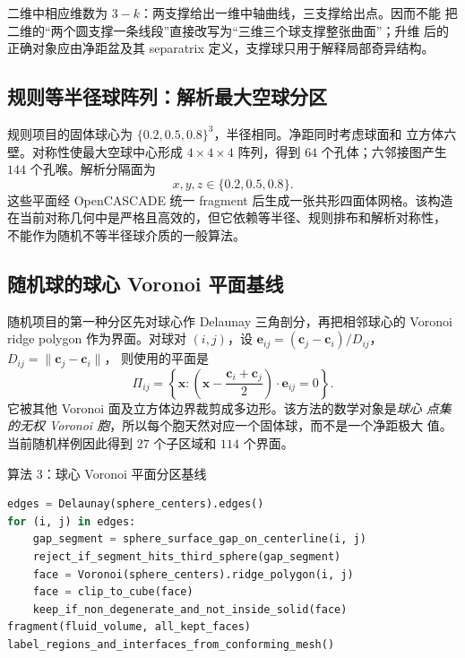 \documentclass[UTF8,zihao=-4]{ctexart}
\begin{document}
二维中相应维数为 $3-k$：两支撑给出一维中轴曲线，三支撑给出点。因而不能
把二维的``两个圆支撑一条线段''直接改写为``三维三个球支撑整张曲面''；升维
后的正确对象应由净距盆及其 separatrix 定义，支撑球只用于解释局部奇异结构。

\subsection{规则等半径球阵列：解析最大空球分区}

规则项目的固体球心为 $\{0.2,0.5,0.8\}^3$，半径相同。净距同时考虑球面和
立方体六壁。对称性使最大空球中心形成 $4\times4\times4$ 阵列，得到
$64$ 个孔体；六邻接图产生 $144$ 个孔喉。解析分隔面为
\begin{equation}
  x,y,z\in\{0.2,0.5,0.8\}.
\end{equation}
这些平面经 OpenCASCADE 统一 fragment 后生成一张共形四面体网格。该构造
在当前对称几何中是严格且高效的，但它依赖等半径、规则排布和解析对称性，
不能作为随机不等半径球介质的一般算法。

\subsection{随机球的球心 Voronoi 平面基线}

随机项目的第一种分区先对球心作 Delaunay 三角剖分，再把相邻球心的 Voronoi
ridge polygon 作为界面。对球对 $(i,j)$，设
$\bm e_{ij}=(\bm c_j-\bm c_i)/D_{ij}$，$D_{ij}=\|\bm c_j-\bm c_i\|$，
则使用的平面是
\begin{equation}\label{eq:vor-plane}
  \Pi_{ij}=\left\{\bm x:
  \left(\bm x-\frac{\bm c_i+\bm c_j}{2}\right)
  \cdot\bm e_{ij}=0\right\}.
\end{equation}
它被其他 Voronoi 面及立方体边界裁剪成多边形。该方法的数学对象是\emph{球心
点集的无权 Voronoi 胞}，所以每个胞天然对应一个固体球，而不是一个净距极大
值。当前随机样例因此得到 $27$ 个子区域和 $114$ 个界面。

\begin{algobox}{算法 3：球心 Voronoi 平面分区基线}
\begin{lstlisting}[style=compactcode,language=Python]
edges = Delaunay(sphere_centers).edges()
for (i, j) in edges:
    gap_segment = sphere_surface_gap_on_centerline(i, j)
    reject_if_segment_hits_third_sphere(gap_segment)
    face = Voronoi(sphere_centers).ridge_polygon(i, j)
    face = clip_to_cube(face)
    keep_if_non_degenerate_and_not_inside_solid(face)
fragment(fluid_volume, all_kept_faces)
label_regions_and_interfaces_from_conforming_mesh()
\end{lstlisting}
\end{algobox}
\end{document}
